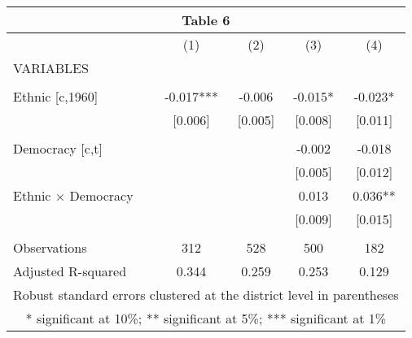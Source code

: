 \begin{tabular}{lcccc}
\multicolumn{5}{c}{Table 6} \\ \hline
 & (1) & (2) & (3) & (4) \\
VARIABLES &  &  &  &  \\ \hline
 &  &  &  &  \\
Ethnic [c,1960] & -0.017*** & -0.006 & -0.015* & -0.023* \\
 & [0.006] & [0.005] & [0.008] & [0.011] \\
 &  &  &  &  \\
Democracy [c,t] &  &  & -0.002 & -0.018 \\
 &  &  & [0.005] & [0.012] \\
Ethnic × Democracy &  &  & 0.013 & 0.036** \\
 &  &  & [0.009] & [0.015] \\
 &  &  &  &  \\
Observations & 312 & 528 & 500 & 182 \\
 Adjusted R-squared & 0.344 & 0.259 & 0.253 & 0.129 \\ \hline
\multicolumn{5}{c}{ Robust standard errors clustered at the district level in parentheses} \\
\multicolumn{5}{c}{ * significant at 10\%; ** significant at 5\%; *** significant at 1\%} \\
\end{tabular}
